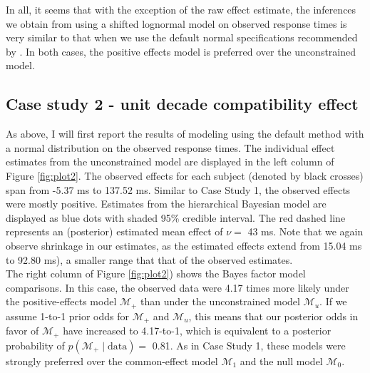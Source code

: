 \documentclass[12pt,twoside,a4paper]{article}
\begin{document}
In all, it seems that with the exception of the raw effect estimate, the inferences we obtain from using a shifted lognormal model on observed response times is very similar to that when we use the default normal specifications recommended by \citet{haaf2017}. In both cases, the positive effects model is preferred over the unconstrained model.

\subsection{Case study 2 - unit decade compatibility effect}

As above, I will first report the results of modeling using the default \citet{haaf2017} method with a normal distribution on the observed response times. The individual effect estimates from the unconstrained model are displayed in the left column of Figure \ref{fig:plot2}. The observed effects for each subject (denoted by black crosses) span from -5.37 ms to 137.52 ms. Similar to Case Study 1, the observed effects were mostly positive. Estimates from the hierarchical Bayesian model are displayed as blue dots with shaded 95\% credible interval. The red dashed line represents an (posterior) estimated mean effect of \(\nu=\) 43 ms. Note that we again observe shrinkage in our estimates, as the estimated effects extend from 15.04 ms to 92.80 ms), a smaller range that that of the observed estimates.\\

The right column of Figure \ref{fig:plot2}) shows the Bayes factor model comparisons. In this case, the observed data were 4.17 times more likely under the positive-effects model \(\mathcal{M}_+\) than under the unconstrained model \(\mathcal{M}_u\). If we assume 1-to-1 prior odds for \(\mathcal{M}_+\) and \(\mathcal{M}_u\), this means that our posterior odds in favor of \(\mathcal{M}_+\) have increased to 4.17-to-1, which is equivalent to a posterior probability of \(p(\mathcal{M}_+ \mid \text{data})=\) 0.81. As in Case Study 1, these models were strongly preferred over the common-effect model \(\mathcal{M}_1\) and the null model \(\mathcal{M}_0\).\\
\end{document}
